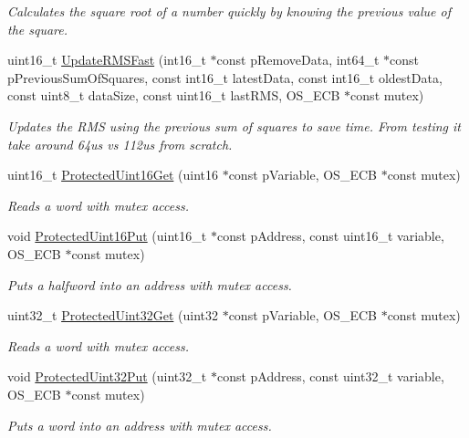 \begin{DoxyCompactItemize}
\begin{DoxyCompactList}\small\item\em Calculates the square root of a number quickly by knowing the previous value of the square. \end{DoxyCompactList}\item 
uint16\+\_\+t \hyperlink{group__main__module_gac84408f9255c9eb0b90c33da1420253f}{Update\+R\+M\+S\+Fast} (int16\+\_\+t $\ast$const p\+Remove\+Data, int64\+\_\+t $\ast$const p\+Previous\+Sum\+Of\+Squares, const int16\+\_\+t latest\+Data, const int16\+\_\+t oldest\+Data, const uint8\+\_\+t data\+Size, const uint16\+\_\+t last\+R\+M\+S, O\+S\+\_\+\+E\+C\+B $\ast$const mutex)
\begin{DoxyCompactList}\small\item\em Updates the R\+M\+S using the previous sum of squares to save time. From testing it take around 64us vs 112us from scratch. \end{DoxyCompactList}\item 
uint16\+\_\+t \hyperlink{group__main__module_ga1e2d03b35da28d24d7744132b344b329}{Protected\+Uint16\+Get} (uint16 $\ast$const p\+Variable, O\+S\+\_\+\+E\+C\+B $\ast$const mutex)
\begin{DoxyCompactList}\small\item\em Reads a word with mutex access. \end{DoxyCompactList}\item 
void \hyperlink{group__main__module_ga525d3b6f47d3ea41e0682aef2962aedf}{Protected\+Uint16\+Put} (uint16\+\_\+t $\ast$const p\+Address, const uint16\+\_\+t variable, O\+S\+\_\+\+E\+C\+B $\ast$const mutex)
\begin{DoxyCompactList}\small\item\em Puts a halfword into an address with mutex access. \end{DoxyCompactList}\item 
uint32\+\_\+t \hyperlink{group__main__module_ga7822fc5e1635c24bd5cb91cd25b6e5e3}{Protected\+Uint32\+Get} (uint32 $\ast$const p\+Variable, O\+S\+\_\+\+E\+C\+B $\ast$const mutex)
\begin{DoxyCompactList}\small\item\em Reads a word with mutex access. \end{DoxyCompactList}\item 
void \hyperlink{group__main__module_ga4668541efc4b93c31fbabaa5364940e2}{Protected\+Uint32\+Put} (uint32\+\_\+t $\ast$const p\+Address, const uint32\+\_\+t variable, O\+S\+\_\+\+E\+C\+B $\ast$const mutex)
\begin{DoxyCompactList}\small\item\em Puts a word into an address with mutex access. \end{DoxyCompactList}\item 

\end{DoxyCompactItemize}
